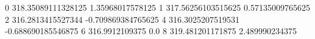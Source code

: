 0 318.35089111328125 1.35968017578125
1 317.56256103515625 0.57135009765625
2 316.2813415527344 -0.709869384765625
4 316.3025207519531 -0.688690185546875
6 316.9912109375 0.0
8 319.481201171875 2.489990234375
